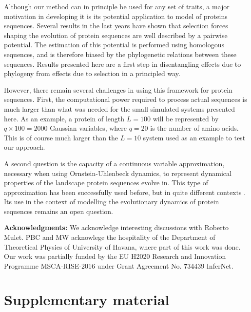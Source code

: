 \documentclass[preprint,amsmath,amssymb,superscriptaddress,showpacs,pre]{revtex4-1}
\begin{document}
Although our method can in principle be used for any set of traits, a major motivation in developing it is its potential application to model of proteins sequences. 
Several results in the last years have shown that selection forces shaping the evolution of protein sequences are well described by a pairwise potential. 
The estimation of this potential is performed using homologous sequences, and is therefore biased by the phylogenetic relations between these sequences.  
Results presented here are a first step in disentangling effects due to phylogeny from effects due to selection in a principled way. 

However, there remain several challenges in using this framework for protein sequences. 
First, the computational power required to process actual sequences is much larger than what was needed for the small simulated systems presented here. 
As an example, a protein of length $L=100$ will be represented by $q\times 100=2000$ Gaussian variables, where $q=20$ is the number of amino acids. 
This is of course much larger than the $L=10$ system used as an example to test our approach. 

A second question is the capacity of a continuous variable approximation, necessary when using Ornstein-Uhlenbeck dynamics, to represent dynamical properties of the landscape protein sequences evolve in. 
This type of approximation has been successfully used before, but in quite different contexts \cite{jones_psicov_2012,barton_large_2014,baldassi_fast_2014}. 
Its use in the context of modelling the evolutionary dynamics of protein sequences remains an open question. 


\textbf{Acknowledgments:} We acknowledge interesting discussions with Roberto Mulet. PBC and MW acknowlege the hospitality of the Department of  Theoretical  Physics of University  of  Havana, where part of this work was done. Our work was partially funded by the EU H2020 Research and Innovation Programme MSCA-RISE-2016 under Grant
Agreement No. 734439 InferNet.


\clearpage




\newpage
\appendix
\setcounter{figure}{0}
\renewcommand{\figurename}{Figure S}
\setcounter{table}{0}
\renewcommand{\tablename}{Table S}

\section{Supplementary material} %
\label{sec:supplementary_material}
\end{document}
